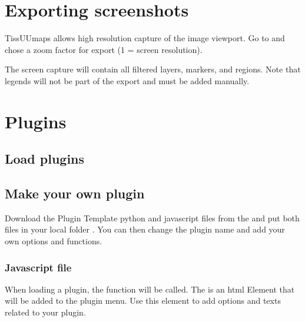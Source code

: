 \documentclass[letterpaper,10pt,english,openany,oneside]{sphinxmanual}
\begin{document}
\sphinxstepscope


\section{Exporting screenshots}
\label{\detokenize{docs/starting/capture:exporting-screenshots}}\label{\detokenize{docs/starting/capture::doc}}
\sphinxAtStartPar
TissUUmaps allows high resolution capture of the image viewport. Go to  and chose a zoom factor for export (1 = screen resolution).

\sphinxAtStartPar
The screen capture will contain all filtered layers, markers, and regions. Note that legends will not be part of the export and must be added manually.

\sphinxstepscope


\section{Plugins}
\label{\detokenize{docs/starting/plugins:plugins}}\label{\detokenize{docs/starting/plugins::doc}}

\subsection{Load plugins}
\label{\detokenize{docs/starting/plugins:load-plugins}}

\subsection{Make your own plugin}
\label{\detokenize{docs/starting/plugins:make-your-own-plugin}}
\sphinxAtStartPar
Download the Plugin Template python and javascript files from the  and put both files in your local folder . You can then change the plugin name and add your own options and functions.


\subsubsection{Javascript file}
\label{\detokenize{docs/starting/plugins:javascript-file}}
\sphinxAtStartPar
When loading a plugin, the function  will be called. The  is an html Element that will be added to the plugin menu. Use this element to add options and texts related to your plugin.
\end{document}
